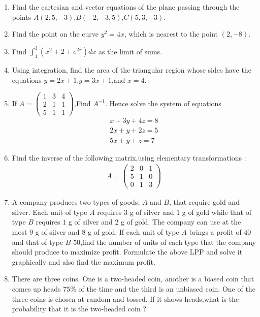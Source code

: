 \documentclass[12pt,-letter paper]{article}
\providecommand{\brak}[1]{\ensuremath{\left(#1\right)}}
\theoremstyle{remark}
\newcommand{\myvec}[1]{\ensuremath{\begin{pmatrix}#1\end{pmatrix}}}
\begin{document}
\begin{enumerate}
\item Find the cartesian and vector equations of the plane passing through the
points $A$\brak{2,5,-3},$B$\brak{-2,-3,5},$C$\brak{5,3,-3}.

\item Find the point on the curve ${y}^2={4x}$, which is nearest to the point $\brak{2,-8}$.

\item Find $\int_{1}^{3}{\brak{x^2+2+e^{2x}}}dx$ as the limit of sums.

\item Using integration, find the area of the triangular region whose sides have
the equations ${y}={2x}+1$,${y}={3x}+1$,and ${x}=4$.

\item If ${A} = \myvec{1&3&4\\2&1&1\\5&1&1}$,Find $A^{-1}$.
        Hence solve the system of equations 
        \begin{align*}
                {x+3y+4z}=8 \\
                {2x+y+2z}=5 \\
                {5x+y+z}=7
                \end{align*}
                
        \item Find the inverse of the following matrix,using elementary transformations :
                \begin{align*}{A} = \myvec{2&0&1\\5&1&0\\ 0&1&3}\end{align*}
                
\item A company produces two types of goods, $A$ and $B$, that require gold and silver. Each unit of type $A$ requires $3$ g of silver and $1$ g of gold while that of type $B$ requires $1$ g of silver and $2$ g of gold. The company can use at the most $9$ g of silver and $8$ g of gold. If each unit of type $A$ brings a profit of \rupee $40$ and that of type $B$ \rupee $50$,find the number of units of each type
that the company should produce to maximize profit. Formulate the above LPP and solve it graphically and also find the maximum profit.

\item There are three coins. One is a two-headed coin, another is a biased coin that comes up heads $75\%$ of the time and the third is an unbiased coin. One of the three coins is chosen at random and tossed. If it shows heads,what is the probability that it is the two-headed coin ?


\end{enumerate}
\end{document}
